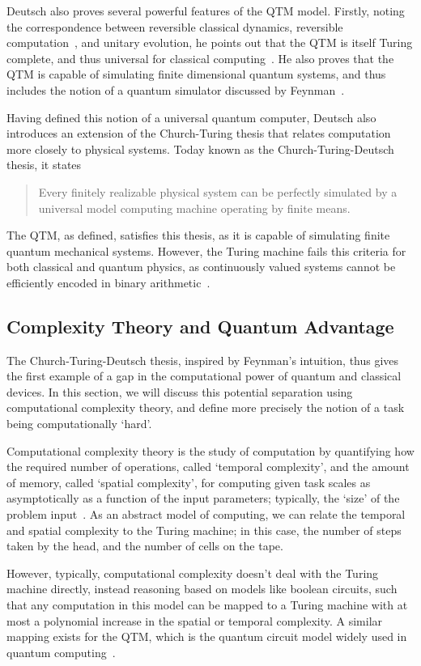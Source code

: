 Deutsch also proves several powerful features of the QTM model. Firstly, noting the correspondence between reversible classical dynamics, reversible computation~\cite{Toffoli1980}, and unitary evolution, he points out that the QTM is itself Turing complete, and thus universal for classical computing~\cite{Deutsch1985}. He also proves that the QTM is capable of simulating finite dimensional quantum systems, and thus includes the notion of a quantum simulator discussed by Feynman~\cite{Deutsch1985}.\par
Having defined this notion of a universal quantum computer, Deutsch also introduces an extension of the Church-Turing thesis that relates computation more closely to physical systems. Today known as the Church-Turing-Deutsch thesis, it states
\begin{quote}
Every finitely realizable physical system can be perfectly simulated by a universal model computing machine operating by finite means.
\end{quote}
The QTM, as defined, satisfies this thesis, as it is capable of simulating finite quantum mechanical systems. However, the Turing machine fails this criteria for both classical and quantum physics, as continuously valued systems cannot be efficiently encoded in binary arithmetic~\cite{Deutsch1985}.
\subsection{Complexity Theory and Quantum Advantage}\label{sec:complexity}
The Church-Turing-Deutsch thesis, inspired by Feynman's intuition, thus gives the first example of a gap in the computational power of quantum and classical devices. In this section, we will discuss this potential separation using computational complexity theory, and define more precisely the notion of a task being computationally `hard'.\par
Computational complexity theory is the study of computation by quantifying how the required number of operations, called `temporal complexity', and the amount of memory, called `spatial complexity', for computing given task scales as asymptotically as a function of the input parameters; typically, the `size' of the problem input~\cite{Nielsen2000}. As an abstract model of computing, we can relate the temporal and spatial complexity to the Turing machine; in this case, the number of steps taken by the head, and the number of cells on the tape.\par
However, typically, computational complexity doesn't deal with the Turing machine directly, instead reasoning based on models like boolean circuits, such that any computation in this model can be mapped to a Turing machine with at most a polynomial increase in the spatial or temporal complexity. A similar mapping exists for the QTM, which is the quantum circuit model widely used in quantum computing~\cite{Yao1993}.\par
